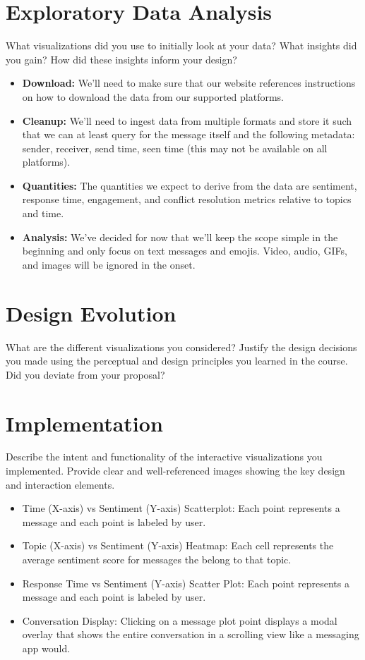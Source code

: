 \documentclass{article}\usepackage{graphicx}
\begin{document}
\section*{Exploratory Data Analysis}
What visualizations did you use to initially look at your data? What insights did you gain? How did these insights inform your design?
\begin{itemize}
    \item \textbf{Download:} We'll need to make sure that our website references instructions on how to download the data from our supported platforms.
    \item \textbf{Cleanup:} We'll need to ingest data from multiple formats and store it such that we can at least query for the message itself and the following metadata: sender, receiver, send time, seen time (this may not be available on all platforms).
    \item \textbf{Quantities:} The quantities we expect to derive from the data are sentiment, response time, engagement, and conflict resolution metrics relative to topics and time.
    \item \textbf{Analysis:} We've decided for now that we'll keep the scope simple in the beginning and only focus on text messages and emojis. Video, audio, GIFs, and images will be ignored in the onset.
\end{itemize}

\section*{Design Evolution}
What are the different visualizations you considered? Justify the design decisions you made using the perceptual and design principles you learned in the course. Did you deviate from your proposal?

\section*{Implementation}
Describe the intent and functionality of the interactive visualizations you implemented. Provide clear and well-referenced images showing the key design and interaction elements.
\begin{itemize}
    \item Time (X-axis) vs Sentiment (Y-axis) Scatterplot: Each point represents a message and each point is labeled by user. 
    \item Topic (X-axis) vs Sentiment (Y-axis) Heatmap: Each cell represents the average sentiment score for messages the belong to that topic. 
    \item Response Time vs Sentiment (Y-axis) Scatter Plot: Each point represents a message and each point is labeled by user. 
    \item Conversation Display: Clicking on a message plot point displays a modal overlay that shows the entire conversation in a scrolling view like a messaging app would.
\end{itemize}
\end{document}
